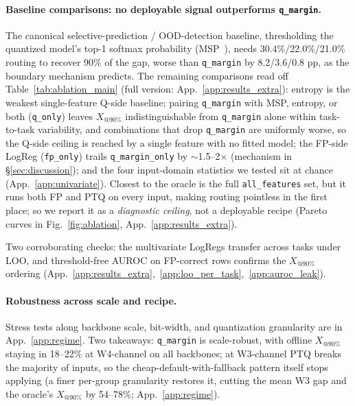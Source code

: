 \documentclass{article}
\makeatletter
\newcommand{\fp}{\textsc{FP}\xspace}
\newcommand{\ptq}{\textsc{PTQ}\xspace}
\newcommand{\xat}[1]{\ensuremath{X_{@#1\%}}}
\makeatother
\begin{document}
\paragraph{Baseline comparisons: no deployable signal outperforms \texttt{q\_margin}.}\label{sec:ablation}
The canonical selective-prediction / OOD-detection baseline, thresholding the quantized model's top-1 softmax probability (MSP~\cite{hendrycks2017baseline,geifman2017selective}), needs 30.4\%/22.0\%/21.0\% routing to recover 90\% of the gap, worse than \texttt{q\_margin} by 8.2/3.6/0.8 pp, as the boundary mechanism predicts. The remaining comparisons read off Table~\ref{tab:ablation_main} (full version: App.~\ref{app:results_extra}): entropy is the weakest single-feature Q-side baseline; pairing \texttt{q\_margin} with MSP, entropy, or both (\texttt{q\_only}) leaves \xat{90} indistinguishable from \texttt{q\_margin} alone within task-to-task variability, and combinations that drop \texttt{q\_margin} are uniformly worse, so the Q-side ceiling is reached by a single feature with no fitted model; the FP-side LogReg (\texttt{fp\_only}) trails \texttt{q\_margin\_only} by $\sim$1.5--2$\times$ (mechanism in \S\ref{sec:discussion}); and the four input-domain statistics we tested sit at chance (App.~\ref{app:univariate}). Closest to the oracle is the full \texttt{all\_features} set, but it runs both \fp and \ptq on every input, making routing pointless in the first place; so we report it as a \emph{diagnostic ceiling}, not a deployable recipe (Pareto curves in Fig.~\ref{fig:ablation}, App.~\ref{app:results_extra}).

Two corroborating checks: the multivariate LogRegs transfer across tasks under LOO, and threshold-free AUROC on FP-correct rows confirms the \xat{90} ordering (App.~\ref{app:results_extra},~\ref{app:loo_per_task},~\ref{app:auroc_leak}).

\paragraph{Robustness across scale and recipe.}\label{sec:regime}
Stress tests along backbone scale, bit-width, and quantization granularity are in App.~\ref{app:regime}. Two takeaways: \texttt{q\_margin} is scale-robust, with offline \xat{90} staying in 18--22\% at W4-channel on all backbones; at W3-channel \ptq{} breaks the majority of inputs, so the cheap-default-with-fallback pattern itself stops applying (a finer per-group granularity restores it, cutting the mean W3 gap and the oracle's \xat{90} by 54--78\%; App.~\ref{app:regime}).
\end{document}
